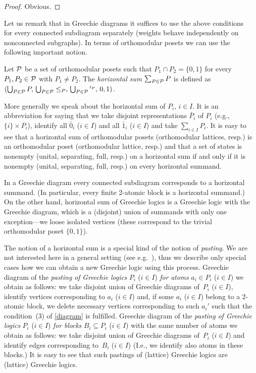 \begin {proof}
Obvious.
\end {proof}


Let us remark that in Greechie diagrams it suffices to use the above
conditions for every connected subdiagram separately (weights behave
independently on nonconnected subgraphs). In terms of orthomodular posets we
can use the following important notion.


\begin {definition}
Let ${\cal P}$ be a set of orthomodular posets such that $P_1\cap P_2 =
\{0,1\}$ for every $P_1,P_2 \in {\cal P}$ with $P_1 \neq P_2$. The
{\em horizontal sum\/} $\sum_{P \in {\cal P}} P$ is defined as $(\bigcup_{P
\in {\cal P}} P,\, \bigcup_{P \in {\cal P}} \le_P,\, \bigcup_{P \in {\cal P}}
\mbox{}^{\prime_P},\, 0, 1)$.
\end {definition}


More generally we speak about the horizontal sum of $P_i$, $i \in I$. It is
an abbreviation for saying that we take disjoint representations $\bar P_i$
of $P_i$ (e.g., $\{i\} \times P_i$), identify all $\bar 0_i$ ($i \in I$) and
all $\bar 1_i$ ($i \in I$) and take $\sum_{i \in I} P_i$. It is easy to see
that a horizontal sum of orthomodular posets (orthomodular lattices, resp.)
is an orthomodular poset (orthomodular lattice, resp.) and that a set of
states is nonempty (unital, separating, full, resp.) on a horizontal sum if
and only if it is nonempty (unital, separating, full, resp.) on every
horizontal summand.

In a Greechie diagram every connected subdiagram corresponds to a horizontal
summand. (In particular, every finite 2-atomic block is a horizontal
summand.) On the other hand, horizontal sum of Greechie logics is a Greechie
logic with the Greechie diagram, which is a (disjoint) union of summands
with only one exception---we loose isolated vertices (these correspond to
the trivial orthomodular poset $\{0,1\}$).

The notion of a horizontal sum is a special kind of the notion of {\em
pasting}. We are not interested here in a general setting (see
e.g.~\cite{NR}), thus we describe only special cases how we can obtain a new
Greechie logic using this process. Greechie diagram of the {\em pasting of
Greechie logics\/} $P_i$ ($i\in I$) {\em for atoms\/} $a_i \in P_i$ ($i\in
I$) we obtain as follows: we take disjoint union of Greechie diagrams
of~$P_i$ ($i\in I$), identify vertices corresponding to $a_i$ ($i\in I$)
and, if some $a_i$ ($i \in I$) belong to a 2-atomic block, we delete
necessary vertices corresponding to such $a_i'$ such that the condition~(3)
of \ref{diagram} is fulfilled. Greechie diagram of the {\em pasting of
Greechie logics\/} $P_i$ ($i \in I$) {\em for blocks\/} $B_i\subseteq P_i$
($i\in I$) with the same number of atoms we obtain as follows: we take
disjoint union of Greechie diagrams of~$P_i$ ($i \in I$) and identify edges
corresponding to~$B_i$ ($i \in I$) (I.e., we identify also atoms in these
blocks.) It is easy to see that such pastings of (lattice) Greechie logics
are (lattice) Greechie logics.

